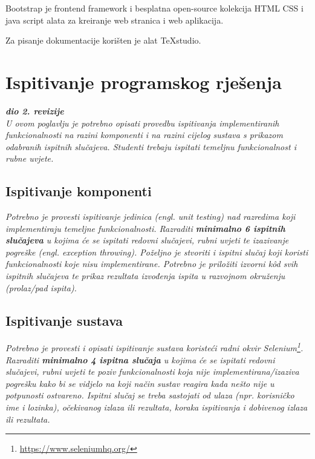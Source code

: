 			\noindent Bootstrap je frontend framework i besplatna open-source kolekcija HTML CSS i java script alata za kreiranje web stranica i web aplikacija.
			
			\noindent Za pisanje dokumentacije korišten je alat TeXstudio.
			
			
			
			\eject 
		
	
		\section{Ispitivanje programskog rješenja}
			
			\textbf{\textit{dio 2. revizije}}\\
			
			 \textit{U ovom poglavlju je potrebno opisati provedbu ispitivanja implementiranih funkcionalnosti na razini komponenti i na razini cijelog sustava s prikazom odabranih ispitnih slučajeva. Studenti trebaju ispitati temeljnu funkcionalnost i rubne uvjete.}
	
			
			\subsection{Ispitivanje komponenti}
			\textit{Potrebno je provesti ispitivanje jedinica (engl. unit testing) nad razredima koji implementiraju temeljne funkcionalnosti. Razraditi \textbf{minimalno 6 ispitnih slučajeva} u kojima će se ispitati redovni slučajevi, rubni uvjeti te izazivanje pogreške (engl. exception throwing). Poželjno je stvoriti i ispitni slučaj koji koristi funkcionalnosti koje nisu implementirane. Potrebno je priložiti izvorni kôd svih ispitnih slučajeva te prikaz rezultata izvođenja ispita u razvojnom okruženju (prolaz/pad ispita). }
			
			
			
			\subsection{Ispitivanje sustava}
			
			 \textit{Potrebno je provesti i opisati ispitivanje sustava koristeći radni okvir Selenium\footnote{\url{https://www.seleniumhq.org/}}. Razraditi \textbf{minimalno 4 ispitna slučaja} u kojima će se ispitati redovni slučajevi, rubni uvjeti te poziv funkcionalnosti koja nije implementirana/izaziva pogrešku kako bi se vidjelo na koji način sustav reagira kada nešto nije u potpunosti ostvareno. Ispitni slučaj se treba sastojati od ulaza (npr. korisničko ime i lozinka), očekivanog izlaza ili rezultata, koraka ispitivanja i dobivenog izlaza ili rezultata.\\ }
			 
